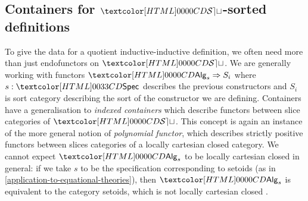 \subsection{Containers for $\SET$-sorted definitions}
To give the data for a quotient inductive-inductive definition, we
often need more than just endofunctors on $\SET$. We are generally
working with functors $\Func{\Alg_s}{S_i}$ where $s : \specty$
describes the previous constructors and $S_i$ is sort category
describing the sort of the constructor we are defining. Containers
have a generalisation to \emph{indexed containers} which describe
functors between slice categories of $\SET$. This concept is again an
instance of the more general notion of \emph{polynomial functor},
which describes strictly positive functors between slices categories
of a locally cartesian closed category. We cannot expect $\Alg_s$ to
be locally cartesian closed in general: if we take $s$ to be the
specification corresponding to setoids (as in
\cref{application-to-equational-theories}), then $\Alg_s$ is equivalent
to the category setoids, which is not locally cartesian closed
\cite{Altenkirch2012}.

